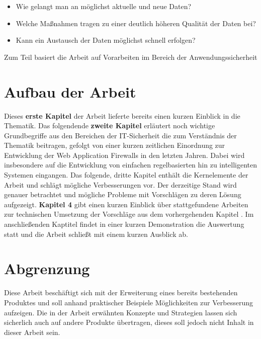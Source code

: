 \begin{itemize}
\item Wie gelangt man an möglichst aktuelle und neue Daten?
\item Welche Maßnahmen tragen zu einer deutlich höheren Qualität der Daten bei?
\item Kann ein Austausch der Daten möglichst schnell erfolgen?
\end{itemize}


Zum Teil basiert die Arbeit auf Vorarbeiten im Bereich der Anwendungssicherheit 


\section{Aufbau der Arbeit}


Dieses \textbf{erste Kapitel} der Arbeit lieferte bereits einen kurzen Einblick in die Thematik. Das folgendende \textbf{zweite Kapitel} erläutert noch wichtige Grundbegriffe aus den Bereichen der IT-Sicherheit die zum Verständnis der Thematik beitragen, gefolgt von einer kurzen zeitlichen Einordnung zur Entwicklung der Web Application Firewalls in den letzten Jahren. Dabei wird insbesondere auf die Entwicklung von einfachen regelbasierten hin zu intelligenten Systemen eingangen. Das folgende, dritte Kapitel enthält die Kernelemente der Arbeit und schlägt mögliche Verbesserungen vor. Der derzeitige Stand wird genauer betrachtet und mögliche Probleme mit Vorschlägen zu deren Lösung aufgezeigt. \textbf{Kapitel 4} gibt einen kurzen Einblick über stattgefundene Arbeiten zur technischen Umsetzung der Vorschläge aus dem vorhergehenden Kapitel . Im anschließenden Kaptitel findet in einer kurzen Demonstration die Auswertung statt und die Arbeit schließt mit einem kurzen Ausblick ab.

\section{Abgrenzung}

Diese Arbeit beschäftigt sich mit der Erweiterung eines bereits bestehenden Produktes und soll anhand praktischer Beispiele Möglichkeiten zur Verbesserung aufzeigen. Die in der Arbeit erwähnten Konzepte und Strategien lassen sich sicherlich auch auf andere Produkte übertragen, dieses soll jedoch nicht Inhalt in dieser Arbeit sein.
